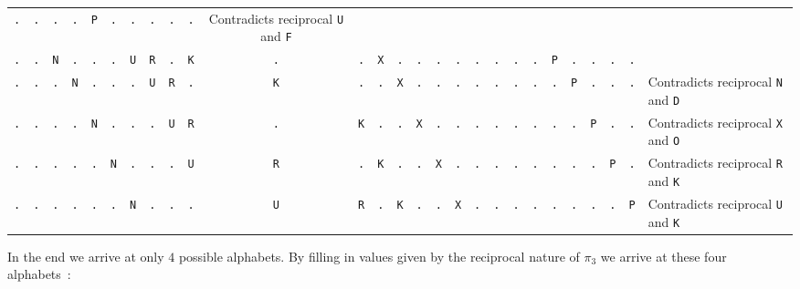 \begin{center}
{\begin{tabular}{|*{26}{c|}l|}
      \texttt{.} & \texttt{.} & \texttt{.} & \texttt{.} &
      \texttt{P} & \texttt{.} & \texttt{.} & \texttt{.} &
      \texttt{.} & \texttt{.} & \;\;Contradicts reciprocal
      \texttt{U} and \texttt{F} \\
      \texttt{.} & \texttt{.} & \texttt{N} & \texttt{.} &
      \texttt{.} & \texttt{.} & \texttt{U} & \texttt{R} &
      \texttt{.} & \texttt{K} & \texttt{.} & \texttt{.} &
      \texttt{X} & \texttt{.} & \texttt{.} & \texttt{.} &
      \texttt{.} & \texttt{.} & \texttt{.} & \texttt{.} &
      \texttt{.} & \texttt{P} & \texttt{.} & \texttt{.} &
      \texttt{.} & \texttt{.} & \;\;{\bf{Possible}}
      \\
      \texttt{.} & \texttt{.} & \texttt{.} & \texttt{N} &
      \texttt{.} & \texttt{.} & \texttt{.} & \texttt{U} &
      \texttt{R} & \texttt{.} & \texttt{K} & \texttt{.} &
      \texttt{.} & \texttt{X} & \texttt{.} & \texttt{.} &
      \texttt{.} & \texttt{.} & \texttt{.} & \texttt{.} &
      \texttt{.} & \texttt{.} & \texttt{P} & \texttt{.} &
      \texttt{.} & \texttt{.} & \;\;Contradicts reciprocal
      \texttt{N} and \texttt{D} \\
      \texttt{.} & \texttt{.} & \texttt{.} & \texttt{.} &
      \texttt{N} & \texttt{.} & \texttt{.} & \texttt{.} &
      \texttt{U} & \texttt{R} & \texttt{.} & \texttt{K} &
      \texttt{.} & \texttt{.} & \texttt{X} & \texttt{.} &
      \texttt{.} & \texttt{.} & \texttt{.} & \texttt{.} &
      \texttt{.} & \texttt{.} & \texttt{.} & \texttt{P} &
      \texttt{.} & \texttt{.} & \;\;Contradicts reciprocal
      \texttt{X} and \texttt{O} \\
      \texttt{.} & \texttt{.} & \texttt{.} & \texttt{.} &
      \texttt{.} & \texttt{N} & \texttt{.} & \texttt{.} &
      \texttt{.} & \texttt{U} & \texttt{R} & \texttt{.} &
      \texttt{K} & \texttt{.} & \texttt{.} & \texttt{X} &
      \texttt{.} & \texttt{.} & \texttt{.} & \texttt{.} &
      \texttt{.} & \texttt{.} & \texttt{.} & \texttt{.} &
      \texttt{P} & \texttt{.} & \;\;Contradicts reciprocal
      \texttt{R} and \texttt{K} \\
      \texttt{.} & \texttt{.} & \texttt{.} & \texttt{.} &
      \texttt{.} & \texttt{.} & \texttt{N} & \texttt{.} &
      \texttt{.} & \texttt{.} & \texttt{U} & \texttt{R} &
      \texttt{.} & \texttt{K} & \texttt{.} & \texttt{.} &
      \texttt{X} & \texttt{.} & \texttt{.} & \texttt{.} &
      \texttt{.} & \texttt{.} & \texttt{.} & \texttt{.} &
      \texttt{.} & \texttt{P} & \;\;Contradicts reciprocal
      \texttt{U} and \texttt{K} \\
      \hline
  \end{tabular}}
\end{center}
\noindent In the end we arrive at only $4$ possible alphabets. By
filling in values given by the reciprocal nature of $\pi_3$ we
arrive at these four alphabets~\cite[p.~100]{Alexander1945}:
\setlength{\tabcolsep}{3pt}
\renewcommand{\arraystretch}{1.1}

